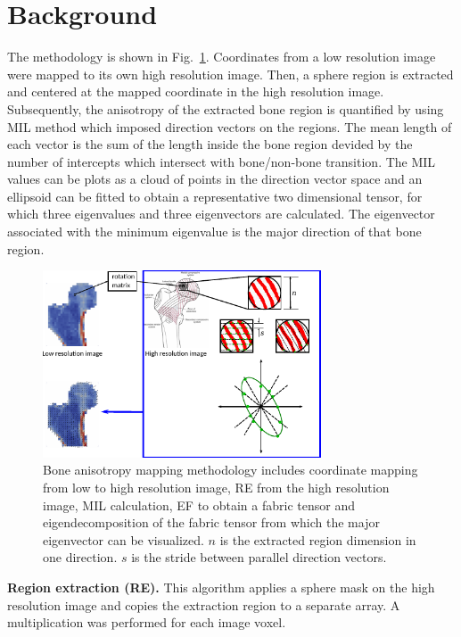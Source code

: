 \documentclass[letterpaper]{article}
\newcommand{\mypar}[1]{{\bf #1.}}
\begin{document}
\section{Background}\label{sec:background}
The methodology is shown in Fig.~\ref{fig:method}. Coordinates from a low resolution image were mapped to its own high resolution image. Then, a sphere region is extracted and centered at the mapped coordinate in the high resolution image. 
Subsequently, the anisotropy of the extracted bone region is quantified by using MIL method which imposed direction vectors on the regions. The mean length of each vector is the sum of the length inside the bone region devided by the number of intercepts which intersect with bone/non-bone transition.
The MIL values can be plots as a cloud of points in the direction vector space and an ellipsoid can be fitted to obtain a representative two dimensional tensor, for which three eigenvalues and three eigenvectors are calculated. The eigenvector associated with the minimum eigenvalue is the major direction of that bone region.

\begin{figure}[ht]
  \centering
  \includegraphics[width=3.25in]{figs/overview.pdf}
  \caption{Bone anisotropy mapping methodology includes coordinate mapping from low to high resolution image, RE from the high resolution image, MIL calculation, EF to obtain a fabric tensor and eigendecomposition of the fabric tensor from which the major eigenvector can be visualized. $n$ is the extracted region dimension in one direction. $s$ is the stride between parallel direction vectors.}
  \label{fig:method}
\end{figure}


\mypar{Region extraction (RE)}
This algorithm applies a sphere mask on the high resolution image and copies the extraction region to a separate array. A multiplication was performed for each image voxel.
\end{document}

